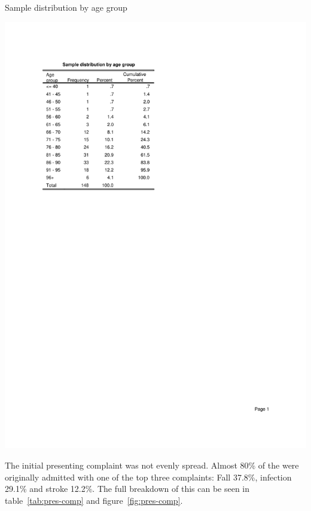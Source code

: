 \documentclass
[
	12pt,
	a4paper,
	oneside,
]{report}
\begin{document}
\begin{table}[ht]
\caption{Sample distribution by age group}
\label{tab:dist-age-group}
\includegraphics[width=\textwidth,
	trim={2.5cm 14cm 2.5cm 2.5cm},
	clip]{media/dist-age-group}
\end{table}

The initial presenting complaint was not evenly spread. Almost 80\% of the
were originally admitted with one of the top three complaints: Fall 37.8\%, 
infection 29.1\% and stroke 12.2\%. The full breakdown of this can be seen in
table~\ref{tab:pres-comp} and figure~\ref{fig:pres-comp}.
\end{document}
